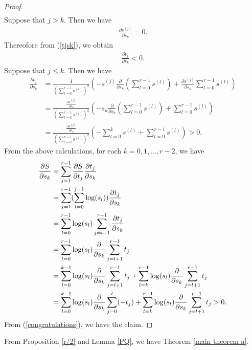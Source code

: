 \documentclass[12pt]{article}
\theoremstyle{definition}
\begin{document}
\begin{proof}
\begin{align}
\end{align}
Suppose that $j>k$. Then we have
\begin{align*}
\frac{\partial s^{(j)}}{\partial s_k}=0.
\end{align*}
Thereofore from (\ref{tjsk}), we obtain 
\begin{align*}
\frac{\partial t_j}{\partial s_k}<0. 
\end{align*}
Suppose that $j\leq k$. Then we have
\begin{align*}
\frac{\partial t_j}{\partial s_k}&=\frac{1}{(\sum_{l=0}^{r-1}s^{(l)})^2}\left(-s^{(j)}\frac{\partial}{\partial s_k}\left(\sum_{l=0}^{r-1}s^{(l)}\right)+\frac{\partial s^{(j)}}{\partial s_k}\sum_{l=0}^{r-1}s^{(l)}\right) \\
&=\frac{\frac{\partial s^{(j)}}{\partial s_k}}{(\sum_{l=0}^{r-1}s^{(l)})^2}\left(-s_k\frac{\partial}{\partial s_k}\left(\sum_{l=0}^{r-1}s^{(l)}\right)+\sum_{l=0}^{r-1}s^{(l)}\right) \\
&=\frac{\frac{\partial s^{(j)}}{\partial s_k}}{(\sum_{l=0}^{r-1}s^{(l)})^2}\left(-\sum_{l=0}^ks^{(l)}+\sum_{l=0}^{r-1}s^{(l)}\right) >0.
\end{align*}
From the above calculations, for each $k=0,1,\dots, r-2$, we have
\begin{align}
\frac{\partial S}{\partial s_k}&=\sum_{j=1}^{r-1}\frac{\partial S}{\partial t_j}\frac{\partial t_j}{\partial s_k} \notag \\
&=\sum_{j=1}^{r-1}(\sum_{l=0}^{j-1}\log (s_l))\frac{\partial t_j}{\partial s_k} \notag \\
&=\sum_{l=0}^{r-1}\log (s_l) \sum_{j=l+1}^{r-1}\frac{\partial t_j}{\partial s_k} \notag \\
&=\sum_{l=0}^{r-1}\log (s_l) \frac{\partial}{\partial s_k}\sum_{j=l+1}^{r-1}t_j \notag \\
&=\sum_{l=0}^{k-1}\log (s_l) \frac{\partial}{\partial s_k}\sum_{j=l+1}^{r-1}t_j+\sum_{l=k}^{r-1}\log (s_l) \frac{\partial}{\partial s_k}\sum_{j=l+1}^{r-1}t_j\notag \\
&=\sum_{l=0}^{k-1}\log (s_l) \frac{\partial}{\partial s_k}\sum_{j=0}^l(-t_j)+\sum_{l=k}^{r-1}\log (s_l) \frac{\partial}{\partial s_k}\sum_{j=l+1}^{r-1}t_j>0. \label{congratulations}
\end{align}
From (\ref{congratulations}), we have the claim. 
\end{proof}

From Proposition \ref{r/2} and Lemma \ref{PQ}, we have Theorem \ref{main theorem a}.
\end{document}
